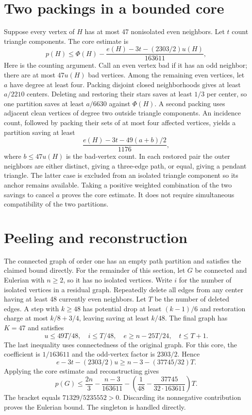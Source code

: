 \documentclass[11pt]{article}
\begin{document}
\section{Two packings in a bounded core}
Suppose every vertex of $H$ has at most 47 nonisolated even neighbors. Let $t$ count triangle components. The core estimate is
\[
 p(H)\leq\Phi(H)-\frac{e(H)-3t-(2303/2)u(H)}{163611},
\]
Here is the counting argument. Call an even vertex bad if it has an odd neighbor; there are at most $47u(H)$ bad vertices. Among the remaining even vertices, let $a$ have degree at least four. Packing disjoint closed neighborhoods gives at least $a/2210$ centers. Deleting and restoring their stars saves at least $1/3$ per center, so one partition saves at least $a/6630$ against $\Phi(H)$.
A second packing uses adjacent clean vertices of degree two outside triangle components. An incidence count, followed by packing their sets of at most four affected vertices, yields a partition saving at least
\[
 \frac{e(H)-3t-49(a+b)/2}{1176},
\]
where $b\leq47u(H)$ is the bad-vertex count. In each restored pair the outer neighbors are either distinct, giving a three-edge path, or equal, giving a pendant triangle. The latter case is excluded from an isolated triangle component so its anchor remains available. Taking a positive weighted combination of the two savings to cancel $a$ proves the core estimate. It does not require simultaneous compatibility of the two partitions.
\section{Peeling and reconstruction}
The connected graph of order one has an empty path partition and satisfies the claimed bound directly. For the remainder of this section, let $G$ be connected and Eulerian with $n\geq2$, so it has no isolated vertices. Write $i$ for the number of isolated vertices in a residual graph. Repeatedly delete all edges from any center having at least 48 currently even neighbors. Let $T$ be the number of deleted edges. A step with $k\geq48$ has potential drop at least $(k-1)/6$ and restoration charge at most $k/8+3/4$, leaving saving at least $k/48$.
The final graph has $K=47$ and satisfies
\[
 u\leq49T/48,\quad i\leq T/48,\quad e\geq n-25T/24,
 \quad t\leq T+1.
\]
The last inequality uses connectedness of the original graph. For this core, the coefficient is $1/163611$ and the odd-vertex factor is $2303/2$. Hence
\[
 e-3t-(2303/2)u\geq n-3-(37745/32)T.
\]
Applying the core estimate and reconstructing gives
\[
 p(G)\leq\frac{2n}{3}-\frac{n-3}{163611}
 -\left(\frac1{48}-\frac{37745}{32\cdot163611}\right)T.
\]
The bracket equals $71329/5235552>0$. Discarding its nonnegative contribution proves the Eulerian bound. The singleton is handled directly.
\end{document}
